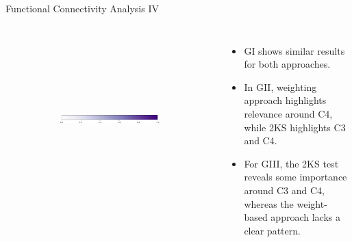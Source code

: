 \documentclass[aspectratio=169]{beamer}
\begin{document}
\begin{frame}{Functional Connectivity Analysis IV}
\begin{columns}
\begin{figure}
{\begin{minipage}{\linewidth}
\begin{subfigure}[b]{.13\linewidth}
            \centering
            \resizebox{1.1\linewidth}{!}{}    
        \end{subfigure}
        ~ 
        \begin{subfigure}[b]{.13\linewidth}
            \centering
            \resizebox{1.1\linewidth}{!}{}
        \end{subfigure}
        ~ 
        \begin{subfigure}[b]{0.13\linewidth}
            \centering
            \resizebox{1.1\linewidth}{!}{}
        \end{subfigure}
        \\
        \centering
        \begin{subfigure}[b]{0.4\linewidth}
            \includegraphics[width=1\linewidth]{../Tesis_document/Figures/Objective_2/colorbar.pdf}
        \end{subfigure}
    \end{minipage}
    }
\end{figure}
\begin{itemize}
    \item GI shows similar results for both approaches.
    \item In GII, weighting approach highlights relevance around C4, while 2KS highlights C3 and C4.
    \item For GIII, the 2KS test reveals some importance around C3 and C4, whereas the weight-based approach lacks a clear pattern.
\end{itemize}
\end{columns}
\end{frame}
\end{document}
